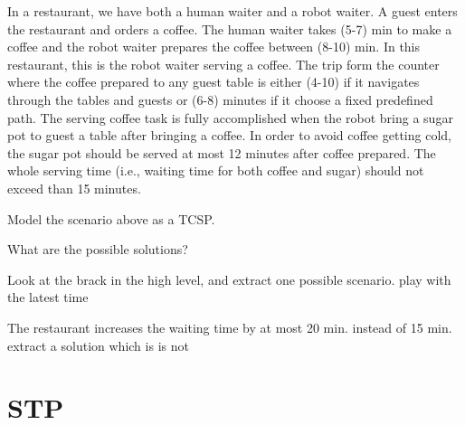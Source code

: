 \documentclass[a4paper]{article}
\begin{document}
In a restaurant, we have both a human waiter and a robot waiter. A guest enters the restaurant and orders a coffee. The human waiter takes (5-7) min to make a coffee and the robot waiter prepares the coffee between (8-10) min. In this restaurant, this is the robot waiter serving a coffee. The trip form the counter where the coffee prepared to any guest table is either (4-10) if it navigates through the tables and guests or (6-8) minutes if it choose a fixed predefined path. The serving coffee task is fully accomplished when the robot bring a sugar pot to guest a table after bringing a coffee. In order to avoid coffee getting cold, the sugar pot should be served at most 12 minutes after coffee prepared. The whole serving time (i.e., waiting time for both coffee and sugar) should not exceed than 15 minutes. 



{\ex{}\label{ex:ex1}  
Model the scenario above as a TCSP. 
\vspace{0.1cm}}

{\ex{}\label{ex:ex1}  
What are the possible solutions? 
\vspace{0.1cm}}


{\ex{}\label{ex:ex1}  
Look at the brack in the high level, and extract one possible scenario. play with the latest time
\vspace{0.1cm}}


{\ex{}\label{ex:ex1}  
The restaurant increases the waiting time by at most 20 min. instead of  15 min. extract a solution which is is not
\vspace{0.1cm}}


\section{STP}

%
%
\end{document}
